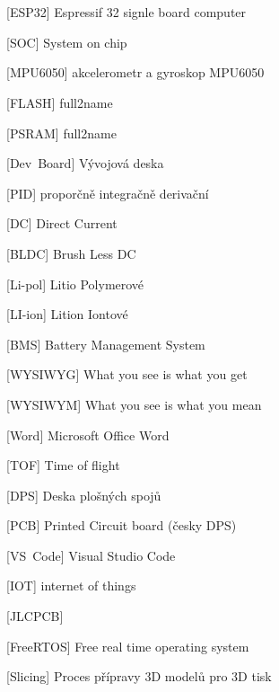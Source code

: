 \cleardoublepage
\chapter*{\listofabbrevname}
{}

\begin{acronym}[99]
	[ESP32]
	{Espressif 32 signle board computer}

	[SOC]
	{System on chip}

	[MPU6050]
	{akcelerometr a gyroskop MPU6050}

	[FLASH]
	{full2name}

	[PSRAM]
	{full2name}

	[Dev~Board]
	{Vývojová deska}

	[PID]
	{proporčně integračně derivační}

	[DC]
	{Direct Current}

	[BLDC]
	{Brush Less DC}

	[Li-pol]
	{Litio Polymerové}

	[LI-ion]
	{Lition Iontové}

	[BMS]
	{Battery Management System}

	[WYSIWYG]
	{What you see is what you get}

	[WYSIWYM]
	{What you see is what you mean}

	[Word]
	{Microsoft Office Word}

	[TOF]
	{Time of flight}

	[DPS]
	{Deska plošných spojů}

	[PCB]
	{Printed Circuit board (česky DPS)}

	[VS~Code]
	{Visual Studio Code}

	[IOT]
	{internet of things}

	[JLCPCB]
	{}

	[FreeRTOS]
	{Free real time operating system}
	
	[Slicing]
	{Proces přípravy 3D modelů pro 3D tisk}


\end{acronym}



